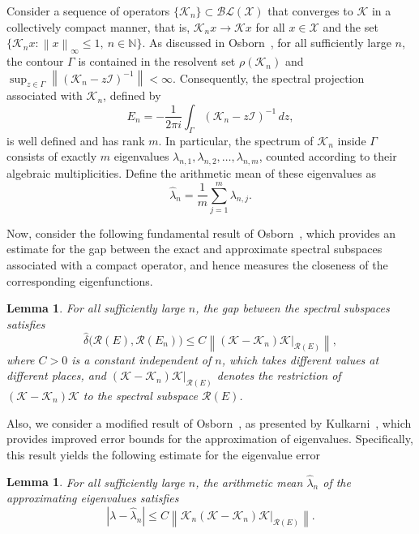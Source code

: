 \documentclass[]{interact}
\theoremstyle{plain}%
\newtheorem{lemma}[theorem]{Lemma}
\theoremstyle{definition}
\theoremstyle{remark}
\newcommand{\norm}[1]{\left\lVert #1\right\rVert}
\begin{document}
Consider a sequence of operators $\{\mathcal{K}_n\} \subset \mathcal{BL}(\mathcal{X})$ that converges to $\mathcal{K}$ in a collectively compact manner, that is,
$\mathcal{K}_n x \to \mathcal{K}x$ for all $x \in \mathcal{X}$ and the set
$\{\mathcal{K}_{n}x : \norm{x}_\infty \le 1,\ n \in \mathbb{N}\}$. As discussed in Osborn~\cite{Osborn}, for all sufficiently large $n$, the contour $\Gamma$ is contained in the resolvent set $\rho(\mathcal{K}_n)$ and
$\sup_{z \in \Gamma} \norm{(\mathcal{K}_n - z\mathcal{I})^{-1}} < \infty.$
Consequently, the spectral projection associated with $\mathcal{K}_n$, defined by
\[
E_n = -\frac{1}{2\pi i} \int_{\Gamma} (\mathcal{K}_n - z\mathcal{I})^{-1} \, dz,
\]
is well defined and has rank $m$. In particular, the spectrum of $\mathcal{K}_n$ inside $\Gamma$ consists of exactly $m$ eigenvalues $\lambda_{n,1}, \lambda_{n,2}, \ldots, \lambda_{n,m}$, counted according to their algebraic multiplicities.
Define the arithmetic mean of these eigenvalues as  
\[
\hat{\lambda}_n = \frac{1}{m} \sum_{j=1}^m \lambda_{n,j}.
\]	

Now, consider the following fundamental result of Osborn~\cite{Osborn}, which provides an estimate for the gap between the exact and approximate spectral subspaces associated with a compact operator, and hence measures the closeness
of the corresponding eigenfunctions.
\begin{lemma}\label{Lem:01}
	For all sufficiently large $n$, the gap between the spectral subspaces satisfies
	\[
	\hat{\delta}\big(\mathcal{R}(E), \mathcal{R}(E_n)\big)
	\le C \norm{(\mathcal{K}-\mathcal{K}_n)\mathcal{K}|_{\mathcal{R}(E)}},
	\]
	where $C >0$ is a constant independent of $n$, which takes different values at different places, and $(\mathcal{K}-\mathcal{K}_n)\mathcal{K}|_{\mathcal{R}(E)}$ denotes the restriction of $(\mathcal{K}-\mathcal{K}_n)\mathcal{K}$ to the spectral subspace $\mathcal{R}(E)$.
\end{lemma}
Also, we consider a modified result of Osborn~\cite[Theorem~2]{Osborn}, as presented
by Kulkarni~\cite[Theorem~2.2]{RPK6}, which provides improved error bounds for the
approximation of eigenvalues. Specifically, this result yields the following
estimate for the eigenvalue error
\begin{lemma}\label{Lem:02}
	For all sufficiently large $n$, the arithmetic mean $\hat{\lambda}_n$ of the
	approximating eigenvalues satisfies
	\[
	|\lambda-\hat{\lambda}_n|
	\le C \norm{\mathcal{K}_n(\mathcal{K}-\mathcal{K}_n)\mathcal{K}|_{\mathcal{R}(E)}}.
	\]
\end{lemma}
\end{document}
